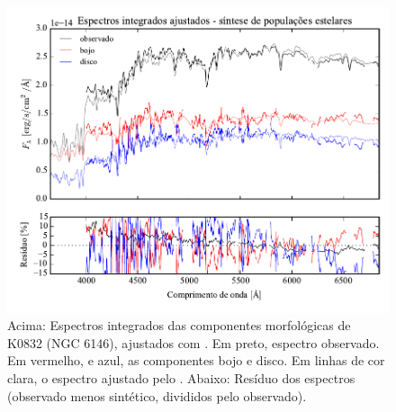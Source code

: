 \begin{figure}
	\includegraphics[page=9,width=\textwidth]{figuras/sample006a_synthesis}
	\caption[Espectros ajustados com \starlight das componentes morfológicas de
	K0832 (NGC 6146)]
	{Acima: Espectros integrados das componentes morfológicas de
	K0832 (NGC 6146), ajustados com \starlight. Em preto, espectro observado. Em
	vermelho, e azul, as componentes bojo e disco. Em linhas de cor clara, o
	espectro ajustado pelo \starlight. Abaixo: Resíduo dos espectros (observado
	menos sintético, divididos pelo observado).}
	\label{fig:decompSintese:K0832}
\end{figure}

